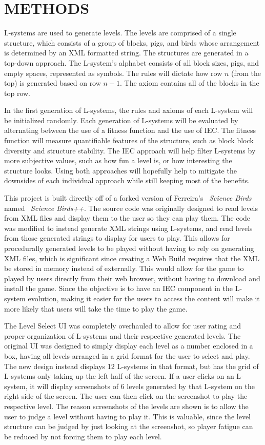 \documentclass[letterpaper, 10 pt, conference]{ieeeconf}
\begin{document}
\section{METHODS}

L-systems are used to generate levels. The levels are comprised of a single structure, which consists of a group of blocks, pigs, and birds whose arrangement is determined by an XML formatted string. The structures are generated in a top-down approach. The L-system's alphabet consists of all block sizes, pigs, and empty spaces, represented as symbols. The rules will dictate how row $n$ (from the top) is generated based on row $n - 1$. The axiom contains all of the blocks in the top row.
\par
In the first generation of L-systems, the rules and axioms of each L-system will be initialized randomly. Each generation of L-systems will be evaluated by alternating between the use of a fitness function and the use of IEC. The fitness function will measure quantifiable features of the structure, such as block  block diversity and structure stability. The IEC approach will help filter L-systems by more subjective values, such as how fun a level is, or how interesting the structure looks. Using both approaches will hopefully help to mitigate the downsides of each individual approach while still keeping most of the benefits.
\par
This project is built directly off of a forked version of Ferreira's ~\textit{Science Birds} named ~\textit{Science Birds++}. The source code was originally designed to read levels from XML files and display them to the user so they can play them. The code was modified to instead generate XML strings using L-systems, and read levels from those generated strings to display for users to play. This allows for procedurally generated levels to be played without having to rely on generating XML files, which is significant since creating a Web Build requires that the XML be stored in memory instead of externally. This would allow for the game to played by users directly from their web browser, without having to download and install the game. Since the objective is to have an IEC component in the L-system evolution, making it easier for the users to access the content will make it more likely that users will take the time to play the game.
\par
The Level Select UI was completely overhauled to allow for user rating and proper organization of L-systems and their respective generated levels. The original UI was designed to simply display each level as a number enclosed in a box, having all levels arranged in a grid format for the user to select and play. The new design instead displays 12 L-systems in that format, but has the grid of L-systems only taking up the left half of the screen. If a user clicks on an L-system, it will display screenshots of 6 levels generated by that L-system on the right side of the screen. The user can then click on the screenshot to play the respective level. The reason screenshots of the levels are shown is to allow the user to judge a level without having to play it. This is valuable, since the level structure can be judged by just looking at the screenshot, so player fatigue can be reduced by not forcing them to play each level.
\end{document}
